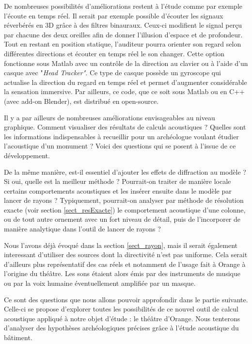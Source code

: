 De nombreuses possibilités d'améliorations restent à l'étude comme par exemple l'écoute en temps réel. Il serait par exemple possible d'écouter les signaux réverbérés en 3D grâce à des filtres binauraux. Ceux-ci modifient le signal perçu par chacune des deux oreilles afin de donner l'illusion d'espace et de profondeur. Tout en restant en position statique, l'auditeur pourra orienter son regard selon différentes directions et écouter en temps réel le son changer. Cette option fonctionne sous Matlab avec un contrôle de la direction au clavier ou à l'aide d'un casque avec "\textit{Head Tracker"}. Ce type de casque possède un gyroscope qui actualise la direction du regard en temps réel et permet d'augmenter considérable la sensation immersive. Par ailleurs, ce code, que ce soit sous Matlab ou en C++ (avec add-on Blender), est distribué en open-source. 

Il y a par ailleurs de nombreuses améliorations envisageables au niveau graphique. Comment visualiser des résultats de calculs acoustiques ? Quelles sont les informations indispensables à recueillir pour un archéologue voulant étudier l'acoustique d'un monument ? Voici des questions qui se posent à l'issue de ce développement.

De la même manière, est-il essentiel d'ajouter les effets de diffraction au modèle ? Si oui, quelle est la meilleur méthode ? Pourrait-on traiter de manière locale certains comportements acoustiques et les insérer ensuite dans le modèle par lancer de rayons ? Typiquement, pourrait-on analyser par méthode de résolution exacte (voir section \ref{sect_resExacte}) le comportement acoustique d'une colonne, ou de tout autre ornement avec un fort niveau de détail, puis de l'incorporer de manière analytique dans l'outil de lancer de rayons ? 

Nous l'avons déjà évoqué dans la section \ref{sect_rayon}, mais il serait également interessant d'utiliser des sources dont la directivité n'est pas uniforme. Cela serait d'ailleurs plus représentatif des cas réels et notamment de l'usage fait à Orange à l'origine du théâtre. Les sons étaient alors émis par des instruments de musique ou par la voix humaine éventuellement amplifiée par un masque.

Ce sont des questions que nous allons pouvoir approfondir dans le partie suivante. Celle-ci se propose d'explorer toutes les possibilités de ce nouvel outil de calcul acoustique appliqué à notre objet d'étude : le théâtre d'Orange. Nous tenterons d'analyser des hypothèses archéologiques précises grâce à l'étude acoustique du bâtiment.



\newpage
	
 
 
